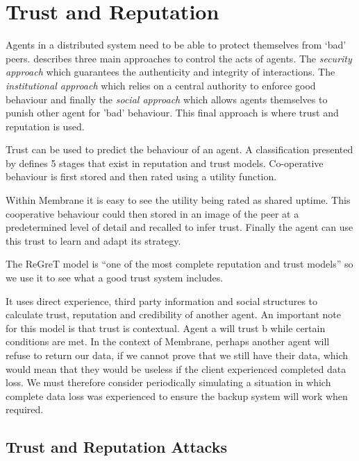 \documentclass[11pt, a4paper, twoside]{report}
\begin{document}
\section{Trust and Reputation}

Agents in a distributed system need to be able to protect themselves from `bad' peers. \cite{pinyol2013computational} describes three main approaches to control the acts of agents. The \emph{security approach} which guarantees the authenticity and integrity of interactions. The \emph{institutional approach} which relies on a central authority to enforce good behaviour and finally the \emph{social approach} which allows agents themselves to punish other agent for 'bad' behaviour. This final approach is where trust and reputation is used.

Trust can be used to predict the behaviour of an agent. \citep{wooldridge2009introduction} A classification presented by \cite{balke2009using} defines 5 stages that exist in reputation and trust models. Co-operative behaviour is first stored and then rated using a utility function.

Within Membrane it is easy to see the utility being rated as shared uptime. This cooperative behaviour could then stored in an image of the peer at a predetermined level of detail and recalled to infer trust. Finally the agent can use this trust to learn and adapt its strategy.

The ReGreT model \citep{sabater2001regret} is ``one of the most complete reputation and trust models'' \citep{pinyol2013computational} so we use it to see what a good trust system includes.

It uses direct experience, third party information and social structures to calculate trust, reputation and credibility of another agent. An important note for this model is that trust is contextual. Agent a will trust b while certain conditions are met. In the context of Membrane, perhaps another agent will refuse to return our data, if we cannot prove that we still have their data, which would mean that they would be useless if the client experienced completed data loss. We must therefore consider periodically simulating a situation in which complete data loss was experienced to ensure the backup system will work when required.

\subsection{Trust and Reputation Attacks} \label{sec:tar}
\end{document}
